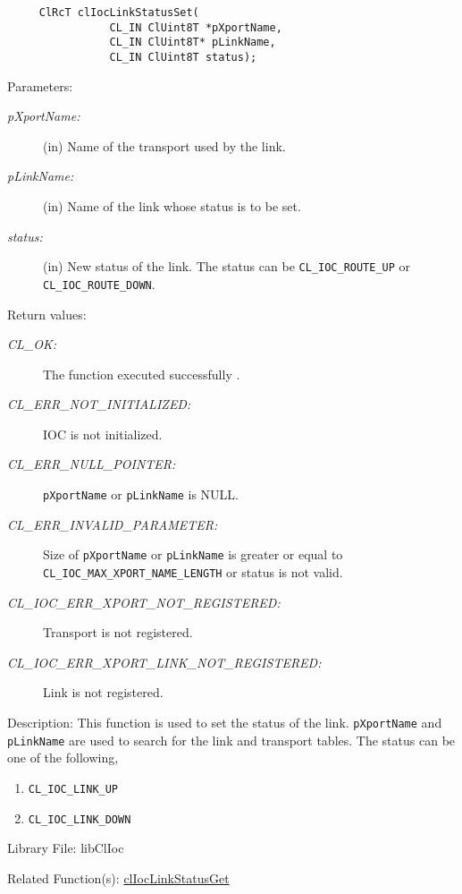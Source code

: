 \begin{flushleft}
\begin{Desc}
\footnotesize\begin{verbatim}     ClRcT clIocLinkStatusSet(
                CL_IN ClUint8T *pXportName,
                CL_IN ClUint8T* pLinkName,
                CL_IN ClUint8T status);
\end{verbatim}
\normalsize
\end{Desc}
\begin{Desc}
\item[Parameters:]
\begin{description}
\item[{\em p\-Xport\-Name:}](in) Name of the transport used by the link. \item[{\em p\-Link\-Name:}](in) Name of the link whose status is to be set. 
\item[{\em status:}](in) New status of the link. The status can be {\tt{CL\_\-IOC\_\-ROUTE\_\-UP}} or {\tt{CL\_\-IOC\_\-ROUTE\_\-DOWN}}.\end{description}
\end{Desc}
\begin{Desc}
\item[Return values:]
\begin{description}
\item[{\em CL\_\-OK:}]The function executed successfully . \item[{\em CL\_\-ERR\_\-NOT\_\-INITIALIZED:}] IOC is not initialized. 
\item[{\em CL\_\-ERR\_\-NULL\_\-POINTER:}]{\tt{pXportName}} or {\tt{pLinkName}} is NULL.
\item[{\em CL\_\-ERR\_\-INVALID\_\-PARAMETER:}] Size of {\tt{p\-Xport\-Name}} or {\tt{p\-Link\-Name}} is greater or equal to 
{\tt{CL\_\-IOC\_\-MAX\_\-XPORT\_\-NAME\_\-LENGTH}} or status is not valid. 
\item[{\em CL\_\-IOC\_\-ERR\_\-XPORT\_\-NOT\_\-REGISTERED:}]Transport is not registered. 
\item[{\em CL\_\-IOC\_\-ERR\_\-XPORT\_\-LINK\_\-NOT\_\-REGISTERED:}]Link is not registered.\end{description}
\end{Desc}
\begin{Desc}
\item[Description:]This function is used to set the status of the link. {\tt{p\-Xport\-Name}} and {\tt{p\-Link\-Name}} are used to search for the link and
transport tables. The status can be one of the following,\begin{enumerate}
\item {\tt{CL\_\-IOC\_\-LINK\_\-UP}} \item {\tt{CL\_\-IOC\_\-LINK\_\-DOWN}} \end{enumerate}
\end{Desc}
\begin{Desc}
\item[Library File:]libClIoc\end{Desc}
\begin{Desc}
\item[Related Function(s):]\hyperlink{pageioc212}{cl\-Ioc\-Link\-Status\-Get} \end{Desc}
\newpage





\end{flushleft}
